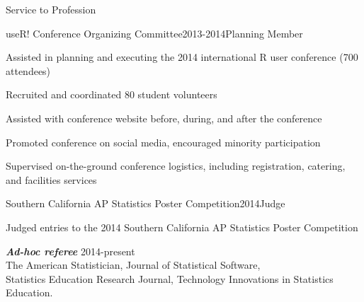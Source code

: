 \documentclass{resume} %
\begin{document}
\begin{rSection}{Service to Profession}



\begin{rSubsection}{useR! Conference Organizing Committee}{}{2013-2014}{Planning Member}
\item Assisted in planning and executing the 2014 international R user conference (700 attendees)
\item Recruited and coordinated 80 student volunteers
\item Assisted with conference website before, during, and after the conference
\item Promoted conference on social media, encouraged minority participation
\item Supervised on-the-ground conference logistics, including registration, catering, and facilities services
\end{rSubsection}



\begin{rSubsection}{Southern California AP Statistics Poster Competition}{}{2014}{Judge}
\item Judged entries to the 2014 Southern California AP Statistics Poster Competition
\end{rSubsection}



{\em \bf Ad-hoc referee }\hfill {2014-present} \\
The American Statistician, Journal of Statistical Software, \\ Statistics Education Research Journal, Technology Innovations in Statistics Education.


%
%
\end{rSection}
\end{document}
